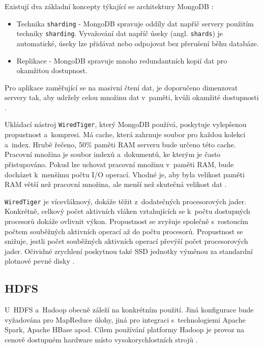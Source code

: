 Existují dva základní koncepty týkající se architektury MongoDB \cite{hwProvisioningMongoDB}:

\begin{itemize}
    \item Technika \texttt{sharding} - MongoDB spravuje oddíly dat napříč servery použitím techniky \texttt{sharding}. Vyvažování dat napříč úseky (angl. \texttt{shards}) je automatické, úseky lze přidávat nebo odpojovat bez přerušení běhu databáze.
    
    \item Replikace - MongoDB spravuje mnoho redundantních kopií dat pro okamžitou dostupnost.
\end{itemize}

\noindent Pro aplikace zaměřující se na masivní čtení dat, je doporučeno dimenzovat servery tak, aby udržely celou množinu dat v~paměti, kvůli okamžité dostupnosti \cite{hwProvisioningMongoDB}.

Ukládací nástroj \texttt{WiredTiger}, který MongoDB používá, poskytuje vylepšenou propustnost a~kompresi. Má cache, která zahrnuje soubor pro každou kolekci a~index. Hrubě řečeno, 50\% paměti RAM serveru bude určeno této cache. Pracovní množina je soubor indexů a~dokumentů, ke kterým je často přistupováno. Pokud lze uchovat pracovní množinu v~paměti RAM, bude docházet k~menšímu počtu I/O operací. Vhodné je, aby byla velikost paměti RAM větší než pracovní množina, ale menší než skutečná velikost dat \cite{sizeYourMongoDBClusters}.

\texttt{WiredTiger} je vícevláknový, dokáže těžit z~dodatečných procesorových jader. Konkrétně, celkový počet aktivních vláken vztahujících se k~počtu dostupných procesorů dokáže ovlivnit výkon. Propustnost se zvyšuje společně s~rostoucím počtem souběžných aktivních operací až do počtu procesorů. Propustnost se snižuje, jestli počet souběžných aktivních operací převýší počet procesorových jader. Očividné zrychlení poskytnou také SSD jednotky výměnou za standardní plotnové pevné disky \cite{mongoDBProductionNotes}.

\subsection{HDFS}
U~HDFS a~Hadoop obecně záleží na konkrétním použití. Jiná konfigurace bude vyžadována pro MapReduce úlohy, jiná pro integraci s~technologiemi Apache Spark, Apache HBase apod. Cílem používání platformy Hadoop je provoz na cenově dostupném hardware místo vysokorychlostních strojů \cite{hadoopHardware}.

